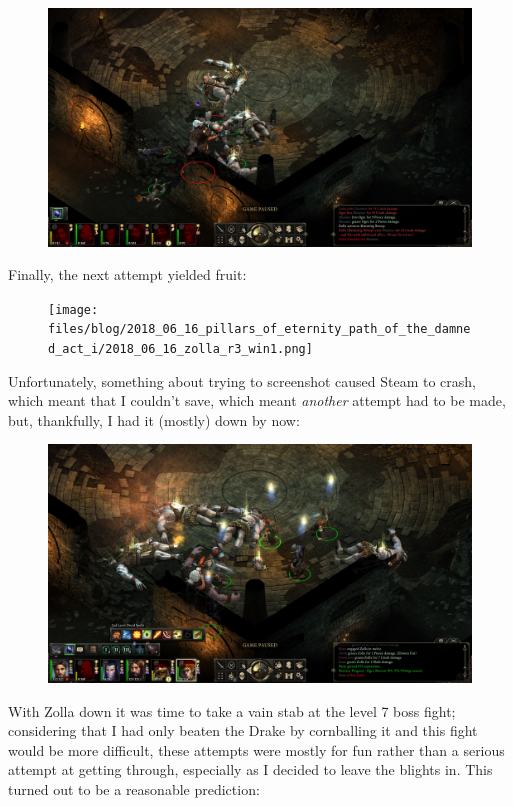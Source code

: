 \documentclass{article}
\begin{document}
\begin{figure}
\includegraphics[scale=0.33]{files/blog/2018_06_16_pillars_of_eternity_path_of_the_damned_act_i/2018_06_16_zolla_r3_wipe.jpg}
\end{figure}

Finally, the next attempt yielded fruit:

\begin{figure}
\texttt{[image: files/blog/2018\_06\_16\_pillars\_of\_eternity\_path\_of\_the\_damned\_act\_i/2018\_06\_16\_zolla\_r3\_win1.png]}
\end{figure}

Unfortunately, something about trying to screenshot caused Steam to crash, which meant that I couldn't save, which meant \emph{another} attempt had to be made, but, thankfully, I had it (mostly) down by now:

\begin{figure}
\includegraphics[scale=0.33]{files/blog/2018_06_16_pillars_of_eternity_path_of_the_damned_act_i/2018_06_16_zolla_r3_win2.jpg}
\end{figure}

With Zolla down it was time to take a vain stab at the level 7 boss fight; considering that I had only beaten the Drake by cornballing it and this fight would be more difficult, these attempts were mostly for fun rather than a serious attempt at getting through, especially as I decided to leave the blights in.  This turned out to be a reasonable prediction:
\end{document}

